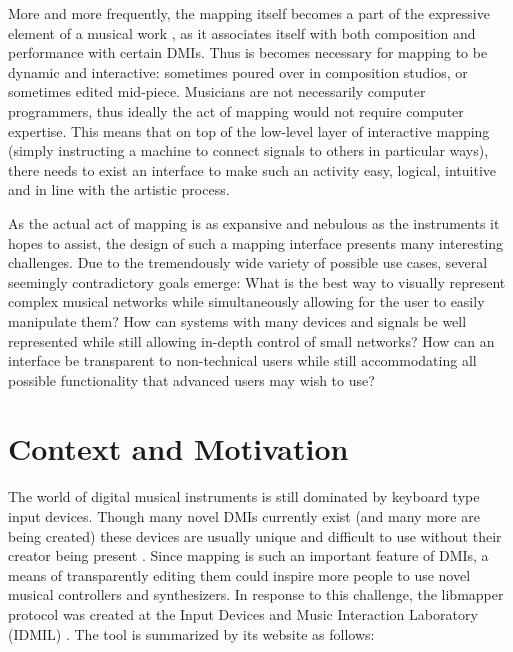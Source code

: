 More and more frequently, the mapping itself becomes a part of the expressive element of a musical work ,
as it associates itself with both composition and performance with certain DMIs. Thus is becomes necessary for mapping to be dynamic and interactive: sometimes poured over in composition studios, or sometimes edited mid-piece. Musicians are not necessarily computer programmers, thus ideally the act of mapping would not require computer expertise. This means that on top of the low-level layer of interactive mapping (simply instructing a machine to connect signals to others in particular ways), there needs to exist an interface to make such an activity easy, logical, intuitive and in line with the artistic process.

As the actual act of mapping is as expansive and nebulous as the instruments it hopes to assist, the design of such a mapping interface presents many interesting challenges. Due to the tremendously wide variety of possible use cases, several seemingly contradictory goals emerge: What is the best way to visually represent complex musical networks while simultaneously allowing for the user to easily manipulate them? How can systems with many devices and signals be well represented while still allowing in-depth control of small networks? How can an interface be transparent to non-technical users while still accommodating all possible functionality that advanced users may wish to use? 


\section{Context and Motivation}

The world of digital musical instruments is still dominated by keyboard type input devices. Though many novel DMIs currently exist (and many more are being created) these devices are usually unique and difficult to use without their creator being present \cite{squeezevox}.
Since mapping is such an important feature of DMIs, a means of transparently editing them could inspire more people to use novel musical controllers and synthesizers. In response to this challenge, the libmapper protocol was created at the Input Devices and Music Interaction Laboratory (IDMIL) . The tool is summarized by its website as follows:

